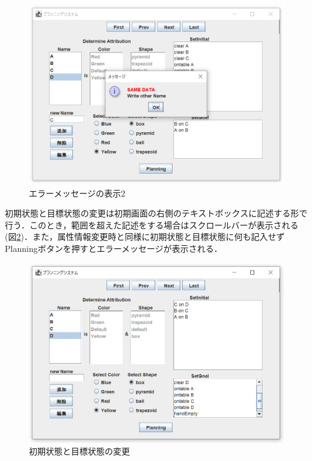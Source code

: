 \documentclass[uplatex,12pt]{jsarticle}
\begin{document}
\begin{figure}[htbp]
  \begin{center}
    \includegraphics[scale=0.6]{images/page8.PNG}
    \caption{エラーメッセージの表示2}
    \label{fig:page8}
  \end{center}
\end{figure}
\clearpage
初期状態と目標状態の変更は初期画面の右側のテキストボックスに記述する形で行う．このとき，範囲を超えた記述をする場合はスクロールバーが表示される(図\ref{fig:page9})．また，属性情報変更時と同様に初期状態と目標状態に何も記入せずPlanningボタンを押すとエラーメッセージが表示される．\\
\begin{figure}[htbp]
  \begin{center}
    \includegraphics[scale=0.6]{images/page9.PNG}
    \caption{初期状態と目標状態の変更}
    \label{fig:page9}
  \end{center}
\end{figure}
\clearpage
\end{document}

